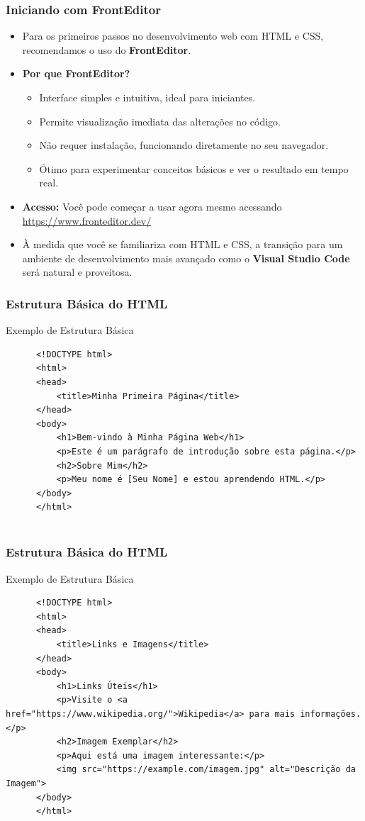 \begin{frame}[fragile]
  \frametitle{Iniciando com FrontEditor}
  \begin{itemize}
    \item Para os primeiros passos no desenvolvimento web com HTML e CSS, recomendamos o uso do \textbf{FrontEditor}.
    \item \textbf{Por que FrontEditor?}
      \begin{itemize}
        \item Interface simples e intuitiva, ideal para iniciantes.
        \item Permite visualização imediata das alterações no código.
        \item Não requer instalação, funcionando diretamente no seu navegador.
        \item Ótimo para experimentar conceitos básicos e ver o resultado em tempo real.
      \end{itemize}
    \item \textbf{Acesso:} Você pode começar a usar agora mesmo acessando \url{https://www.fronteditor.dev/}
    \item À medida que você se familiariza com HTML e CSS, a transição para um ambiente de desenvolvimento mais avançado como o \textbf{Visual Studio Code} será natural e proveitosa.
  \end{itemize}
\end{frame}

\begin{frame}[fragile]
  \frametitle{Estrutura Básica do HTML}
  \begin{block}{Exemplo de Estrutura Básica}
    \small
    \begin{verbatim}
      <!DOCTYPE html>
      <html>
      <head>
          <title>Minha Primeira Página</title>
      </head>
      <body>
          <h1>Bem-vindo à Minha Página Web</h1>
          <p>Este é um parágrafo de introdução sobre esta página.</p>
          <h2>Sobre Mim</h2>
          <p>Meu nome é [Seu Nome] e estou aprendendo HTML.</p>
      </body>
      </html>
      
    \end{verbatim}
  \end{block}
\end{frame}

\begin{frame}[fragile]
  \frametitle{Estrutura Básica do HTML}
  \begin{block}{Exemplo de Estrutura Básica}
    \small
    \begin{verbatim}
      <!DOCTYPE html>
      <html>
      <head>
          <title>Links e Imagens</title>
      </head>
      <body>
          <h1>Links Úteis</h1>
          <p>Visite o <a href="https://www.wikipedia.org/">Wikipedia</a> para mais informações.</p>
          <h2>Imagem Exemplar</h2>
          <p>Aqui está uma imagem interessante:</p>
          <img src="https://example.com/imagem.jpg" alt="Descrição da Imagem">
      </body>
      </html>

    \end{verbatim}
  \end{block}
\end{frame}

